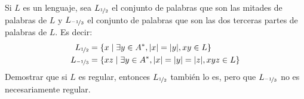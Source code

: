 \begin{ejercicio}\label{ej:1.3.38}
    Si $L$ es un lenguaje, sea $L_{\nicefrac{1}{2}}$ el conjunto de palabras que son las mitades de palabras de $L$ y $L_{\nicefrac{-1}{3}}$ el conjunto de palabras que son las dos terceras partes de palabras de $L$. Es decir:
    \begin{align*}
        L_{\nicefrac{1}{2}} &= \{x\mid \exists y\in A^\ast, |x|=|y|, xy\in L\} \\
        L_{\nicefrac{-1}{3}} &= \{xz\mid \exists y\in A^\ast, |x|=|y|=|z|, xyz\in L\}
    \end{align*}
    Demostrar que si $L$ es regular, entonces $L_{\nicefrac{1}{2}}$ también lo es, pero que $L_{\nicefrac{-1}{3}}$ no es necesariamente regular.
\end{ejercicio}